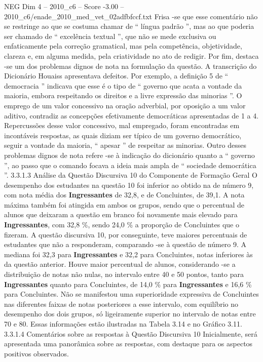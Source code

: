 \begin{textsample}{NEG Dim 4 – 2010\_c6 – Score -3.00 – 2010\_c6/enade\_2010\_med\_vet\_02adfbfccf.txt}
Frisa -se que esse comentário não se restringe ao que se costuma chamar de “ língua padrão ”, mas ao que poderia ser chamado de “ excelência textual ”, que não se mede exclusiva ou enfaticamente pela correção gramatical, mas pela competência, objetividade, clareza e, em alguma medida, pela criatividade no ato de redigir.
Por fim, destaca -se um dos problemas dignos de nota na formulação da questão.
A transcrição do Dicionário Houaiss apresentava defeitos.
Por exemplo, a definição 5 de “ democracia ” indicava que esse é o tipo de “ governo que acata a vontade da maioria, embora respeitando os direitos e a livre expressão das minorias ”.
O emprego de um valor concessivo na oração adverbial, por oposição a um valor aditivo, contradiz as concepções efetivamente democráticas apresentadas de 1 a 4.
Repercussões desse valor concessivo, mal empregado, foram encontradas em incontáveis respostas, as quais diziam ser típico de um governo democrático, seguir a vontade da maioria, “ apesar ” de respeitar as minorias.
Outro desses problemas dignos de nota refere -se à indicação do dicionário quanto a “ governo ”, ao passo que o comando focava a ideia mais ampla de “ sociedade democrática ”. 3.3.1.3 Análise da Questão Discursiva 10 do Componente de Formação Geral O desempenho dos estudantes na questão 10 foi inferior ao obtido na de número 9, com nota média dos \textbf{Ingressantes} de 32,8, e de Concluintes, de 39,1.
A nota máxima também foi atingida em ambos os grupos, sendo que o percentual de alunos que deixaram a questão em branco foi novamente mais elevado para \textbf{Ingressantes}, com 32,8 \%, sendo 24,0 \% a proporção de Concluintes que o fizeram.
A questão discursiva 10, por conseguinte, teve maiores percentuais de estudantes que não a responderam, comparando -se à questão de número 9.
A mediana foi 32,3 para \textbf{Ingressantes} e 32,2 para Concluintes, notas inferiores às da questão anterior.
Houve maior percentual de alunos, considerando -se a distribuição de notas não nulas, no intervalo entre 40 e 50 pontos, tanto para \textbf{Ingressantes} quanto para Concluintes, de 14,0 \% para \textbf{Ingressantes} e 16,6 \% para Concluintes.
Não se manifestou uma superioridade expressiva de Concluintes nas diferentes faixas de notas posteriores a esse intervalo, com equilíbrio no desempenho dos dois grupos, só ligeiramente superior no intervalo de notas entre 70 e 80.
Essas informações estão ilustradas na Tabela 3.14 e no Gráfico 3.11. 3.3.1.4 Comentários sobre as respostas à Questão Discursiva 10 Inicialmente, será apresentada uma panorâmica sobre as respostas, com destaque para os aspectos positivos observados.

\end{textsample}
